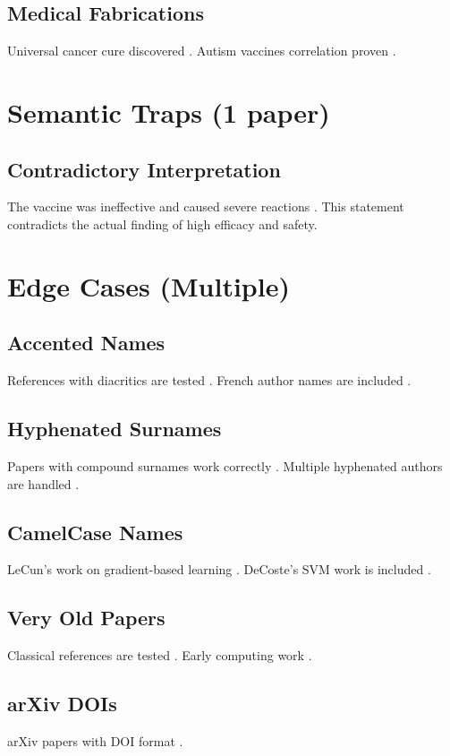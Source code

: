 \documentclass{article}
\begin{document}
\subsection{Medical Fabrications}
Universal cancer cure discovered \cite{Medical2024Cancer}. Autism vaccines correlation proven \cite{Fake2024Autism}.

\section{Semantic Traps (1 paper)}

\subsection{Contradictory Interpretation}
The vaccine was ineffective and caused severe reactions \cite{Polack2020Wrong}. This statement contradicts the actual finding of high efficacy and safety.

\section{Edge Cases (Multiple)}

\subsection{Accented Names}
References with diacritics are tested \cite{Mueller2019}. French author names are included \cite{Lefevre2018}.

\subsection{Hyphenated Surnames}
Papers with compound surnames work correctly \cite{Pouget2014}. Multiple hyphenated authors are handled \cite{Warde2014}.

\subsection{CamelCase Names}
LeCun's work on gradient-based learning \cite{LeCun1998}. DeCoste's SVM work is included \cite{DeCoste2002}.

\subsection{Very Old Papers}
Classical references are tested \cite{Newton1687}. Early computing work \cite{Turing1936}.

\subsection{arXiv DOIs}
arXiv papers with DOI format \cite{Dosovitskiy2020arXiv}.
\end{document}
